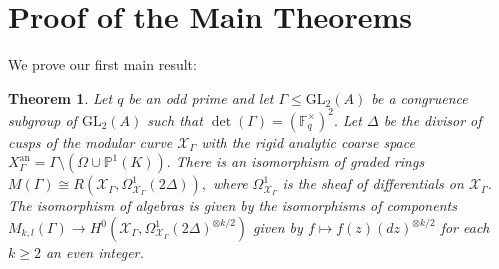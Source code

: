 \documentclass[11pt]{amsart}
\newtheorem{theorem}{Theorem}[section]
\theoremstyle{definition}
\numberwithin{equation}{section}
\newcommand{\GL}{\mathrm{GL}} 	%
\newcommand{\sX}{\mathscr{X}}		%
\newcommand{\bbF}{\mathbb{F}}		%
\newcommand{\bbP}{\mathbb{P}}		%
\begin{document}
		\section{Proof of the Main Theorems}
		\label{s: Proof of main thm}
		
		We prove our first main result:
		
		\begin{theorem}\label{thm: forms to differentials}
			Let $q$ be an odd prime and let $\Gamma\leq \GL_2(A)$ be a congruence subgroup of $\GL_2(A)$ such that $\det(\Gamma)= (\bbF_q^{\times})^2.$ Let $\Delta$ be the divisor of cusps of the modular curve $\sX_{\Gamma}$ with the rigid analytic coarse space $X_{\Gamma}^{\text{an}}=\Gamma\setminus(\Omega\cup \bbP^1(K)).$ 
			There is an isomorphism of graded rings $M(\Gamma)\cong R(\sX_{\Gamma},\Omega^1_{\sX_{\Gamma}}(2\Delta)),$ where $\Omega^1_{\sX_{\Gamma}}$ is the sheaf of differentials on $\sX_{\Gamma}.$ The isomorphism of algebras is given by the isomorphisms of components $M_{k,l}(\Gamma)\to H^0(\sX_{\Gamma},\Omega^1_{\sX_{\Gamma}}(2\Delta)^{\otimes k/2})$ given by $f\mapsto f(z)(dz)^{\otimes k/2}$ for each $k\geq 2$ an even integer. 
		\end{theorem}
\end{document}
